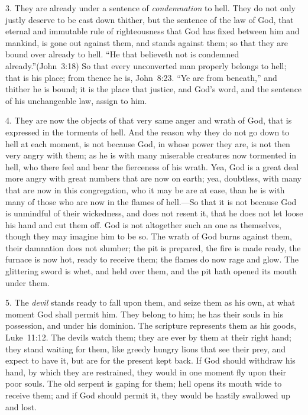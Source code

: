 \documentclass[
]{book}
\begin{document}
3. They are already under a sentence of \emph{condemnation} to hell. They do not only justly deserve to be cast down thither, but the sentence of the law of God, that eternal and immutable rule of righteousness that God has fixed between him and mankind, is gone out against them, and stands against them; so that they are bound over already to hell. ``He that believeth not is condemned already.''(John~3:18) So that every unconverted man properly belongs to hell; that is his place; from thence he is, John~8:23. ``Ye are from beneath,'' and thither he is bound; it is the place that justice, and God's word, and the sentence of his unchangeable law, assign to him.

4. They are now the objects of that very same anger and wrath of God, that is expressed in the torments of hell. And the reason why they do not go down to hell at each moment, is not because God, in whose power they are, is not then very angry with them; as he is with many miserable creatures now tormented in hell, who there feel and bear the fierceness of his wrath. Yea, God is a great deal more angry with great numbers that are now on earth; yea, doubtless, with many that are now in this congregation, who it may be are at ease, than he is with many of those who are now in the flames of hell.---So that it is not because God is unmindful of their wickedness, and does not resent it, that he does not let loose his hand and cut them off. God is not altogether such an one as themselves, though they may imagine him to be so. The wrath of God burns against them, their damnation does not slumber; the pit is prepared, the fire is made ready, the furnace is now hot, ready to receive them; the flames do now rage and glow. The glittering sword is whet, and held over them, and the pit hath opened its mouth under them.

5. The \emph{devil} stands ready to fall upon them, and seize them as his own, at what moment God shall permit him. They belong to him; he has their souls in his possession, and under his dominion. The scripture represents them as his goods, Luke~11:12. The devils watch them; they are ever by them at their right hand; they stand waiting for them, like greedy hungry lions that see their prey, and expect to have it, but are for the present kept back. If God should withdraw his hand, by which they are restrained, they would in one moment fly upon their poor souls. The old serpent is gaping for them; hell opens its mouth wide to receive them; and if God should permit it, they would be hastily swallowed up and lost.
\end{document}
